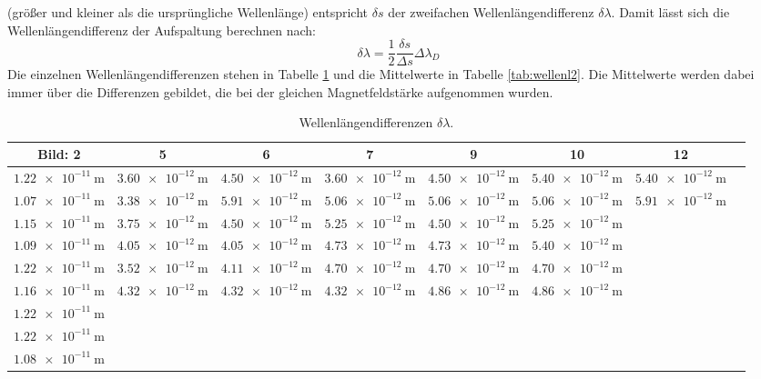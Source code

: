 \documentclass[
  bibliography=totoc,     %
  captions=tableheading,  %
  titlepage=firstiscover, %
]{scrartcl}
\begin{document}
(größer und kleiner als die ursprüngliche Wellenlänge) entspricht $\delta s$ der zweifachen
Wellenlängendifferenz $\delta\lambda$.
Damit lässt sich die Wellenlängendifferenz der Aufspaltung berechnen nach:
\begin{equation}
  \delta\lambda = \frac{1}{2} \frac{\delta s}{\Delta s} \Delta\lambda_D
\end{equation}
Die einzelnen Wellenlängendifferenzen stehen in Tabelle \ref{tab:wellenl} und die Mittelwerte in Tabelle \ref{tab:wellenl2}.
Die Mittelwerte werden dabei immer über die Differenzen gebildet, die bei der gleichen
Magnetfeldstärke aufgenommen wurden.
\begin{landscape}
\begin{table}[H]
  \centering
  \caption{Wellenlängendifferenzen $\delta \lambda$.}
  \label{tab:wellenl}
  \begin{tabular}{c c c c c c c c}
    \toprule
    Bild: 2 & 5 & 6 & 7 & 9 & 10 & 12 \\
    \midrule
    $\SI{1.22e-11}{\meter}$ & $\SI{3.60e-12}{\meter}$ & $\SI{4.50e-12}{\meter}$ & $\SI{3.60e-12}{\meter}$ & $\SI{4.50e-12}{\meter}$ & $\SI{5.40e-12}{\meter}$ & $\SI{5.40e-12}{\meter}$ \\
    $\SI{1.07e-11}{\meter}$ & $\SI{3.38e-12}{\meter}$ & $\SI{5.91e-12}{\meter}$ & $\SI{5.06e-12}{\meter}$ & $\SI{5.06e-12}{\meter}$ & $\SI{5.06e-12}{\meter}$ & $\SI{5.91e-12}{\meter}$ \\
    $\SI{1.15e-11}{\meter}$ & $\SI{3.75e-12}{\meter}$ & $\SI{4.50e-12}{\meter}$ & $\SI{5.25e-12}{\meter}$ & $\SI{4.50e-12}{\meter}$ & $\SI{5.25e-12}{\meter}$ &  \\
    $\SI{1.09e-11}{\meter}$ & $\SI{4.05e-12}{\meter}$ & $\SI{4.05e-12}{\meter}$ & $\SI{4.73e-12}{\meter}$ & $\SI{4.73e-12}{\meter}$ & $\SI{5.40e-12}{\meter}$ &  \\
    $\SI{1.22e-11}{\meter}$ & $\SI{3.52e-12}{\meter}$ & $\SI{4.11e-12}{\meter}$ & $\SI{4.70e-12}{\meter}$ & $\SI{4.70e-12}{\meter}$ & $\SI{4.70e-12}{\meter}$ &  \\
    $\SI{1.16e-11}{\meter}$ & $\SI{4.32e-12}{\meter}$ & $\SI{4.32e-12}{\meter}$ & $\SI{4.32e-12}{\meter}$ & $\SI{4.86e-12}{\meter}$ & $\SI{4.86e-12}{\meter}$ &  \\
    $\SI{1.22e-11}{\meter}$ &  &  &  &  &  &  \\
    $\SI{1.22e-11}{\meter}$ &  &  &  &  &  &  \\
    $\SI{1.08e-11}{\meter}$ &  &  &  &  &  &  \\
    \bottomrule
  \end{tabular}

\end{table}
\end{landscape}
\end{document}
